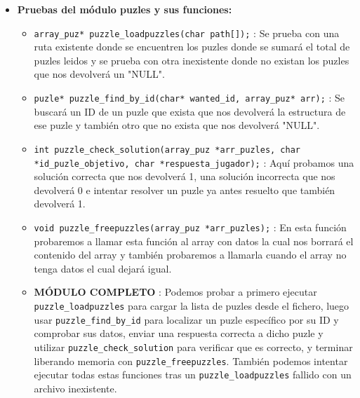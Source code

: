 \begin{itemize}
		\item \textbf{Pruebas del módulo puzles y sus funciones:}
		\begin{itemize}
			\item \verb|array_puz* puzzle_loadpuzzles(char path[]);| : Se prueba con una ruta existente donde se encuentren los puzles 
			donde se sumará el total de puzles leidos y se prueba con otra inexistente donde no existan los puzles que nos devolverá un "NULL".
			\item \verb|puzle* puzzle_find_by_id(char* wanted_id, array_puz* arr);| : Se buscará un ID de un puzle que exista que nos 
			devolverá la estructura de ese puzle y también otro que no exista que nos devolverá "NULL".
			\item \verb|int puzzle_check_solution(array_puz *arr_puzles, char *id_puzle_objetivo, char *respuesta_jugador);| : 
			Aquí probamos una solución correcta que nos devolverá 1, una solución incorrecta que nos devolverá 0 e intentar resolver 
			un puzle ya antes resuelto que también devolverá 1.
			\item \verb|void puzzle_freepuzzles(array_puz *arr_puzles);| : En esta función probaremos a llamar esta función 
			al array con datos la cual nos borrará el contenido del array y también probaremos a llamarla cuando el array no tenga 
			datos el cual dejará igual.
			\\ \item \textbf{MÓDULO COMPLETO} : Podemos probar a primero ejecutar \texttt{puzzle\_loadpuzzles} para cargar
			 la lista de puzles desde el fichero, luego usar \texttt{puzzle\_find\_by\_id} para localizar un puzle específico por su ID 
			 y comprobar sus datos, enviar una respuesta correcta a dicho puzle y utilizar \texttt{puzzle\_check\_solution} para verificar 
			 que es correcto, y terminar liberando memoria con \texttt{puzzle\_freepuzzles}. También podemos intentar ejecutar todas estas 
			 funciones tras un \texttt{puzzle\_loadpuzzles} fallido con un archivo inexistente.
		\end{itemize}


\end{itemize}
